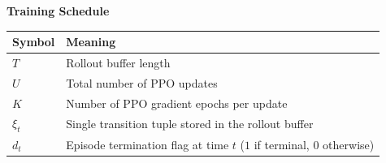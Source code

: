 \vspace{0.8em}

\textbf{Training Schedule}

\begin{tabular}{|m{2.8cm}|m{11.3cm}|}
\hline
\textbf{Symbol} & \textbf{Meaning} \\
\hline
$T$ & Rollout buffer length \\
\hline
$U$ & Total number of PPO updates \\
\hline
$K$ & Number of PPO gradient epochs per update \\
\hline
$\xi_t$ & Single transition tuple stored in the rollout buffer \\
\hline
$d_t$ & Episode termination flag at time $t$ ($1$ if terminal, $0$ otherwise) \\
\hline
\end{tabular}
